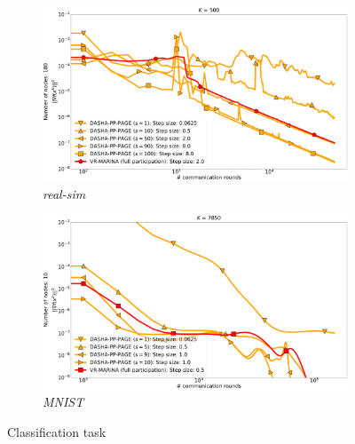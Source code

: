 \documentclass[12pt]{article}
\begin{document}
\begin{figure}[H]
    \begin{subfigure}{.5\textwidth}
        \includegraphics[width=\textwidth]{tmp_launch/neurips_2022_finite_sum_real-sim_nof_500_numnodes_100_more_probs_batch_size_1.pdf}
        \caption{\textit{real-sim}}
    \end{subfigure}
    \begin{subfigure}{.5\textwidth}
        \includegraphics[width=\textwidth]{tmp_launch/neurips_2022_finite_sum_mnist_nof_7850_numnodes_10_more_probs_batch_size_100_split_by_labels_logistic.pdf}
        \caption{\textit{MNIST}}
    \end{subfigure}
\caption{Classification task}
\label{fig:finite-sum}
\end{figure}

\end{document}
